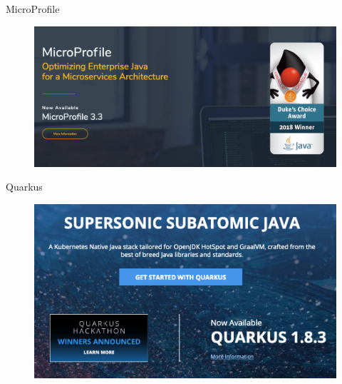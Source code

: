\documentclass[aspectratio=169]{beamer}
\begin{document}
\begin{frame}{MicroProfile}

	\begin{figure}
		\centering
		\includegraphics[width=\linewidth]{Images/microprofile}
	\end{figure}

\end{frame}

\begin{frame}{Quarkus}

	\begin{figure}
		\centering
		\includegraphics[width=\linewidth]{Images/quarkus}
	\end{figure}

\end{frame}
\end{document}
